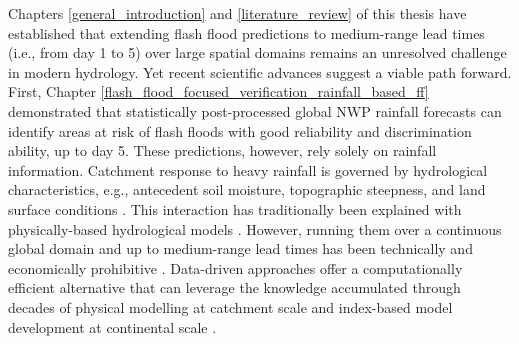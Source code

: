 Chapters  \ref{general_introduction} and \ref{literature_review} of this thesis have established that extending flash flood predictions to medium-range lead times (i.e., from day 1 to 5) over large spatial domains remains an unresolved challenge in modern hydrology. Yet recent scientific advances suggest a viable path forward. First, Chapter \ref{flash_flood_focused_verification_rainfall_based_ff} demonstrated that statistically post-processed global NWP rainfall forecasts can identify areas at risk of flash floods with good reliability and discrimination ability, up to day 5. These predictions, however, rely solely on rainfall information. Catchment response to heavy rainfall is governed by hydrological characteristics, e.g., antecedent soil moisture, topographic steepness, and land surface conditions \citep{Zanchetta_2020}. This interaction has traditionally been explained with physically-based hydrological models \citep{Panigrahi_2025}. However, running them over a continuous global domain and up to medium-range lead times has been technically and economically prohibitive \citep{Philipp_2016}. Data-driven approaches offer a computationally efficient alternative that can leverage the knowledge accumulated through decades of physical modelling at catchment scale and index-based model development at continental scale \citep{Kratzert_2019}.


